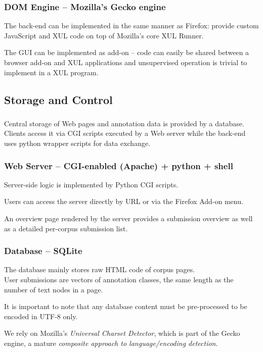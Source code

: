 \documentclass{beamer}
\begin{document}
        \begin{frame}
            \frametitle{DOM Engine -- Mozilla's Gecko engine}
            \begin{block}{}
                The back-end can be implemented in the same manner as Firefox: provide custom JavaScript and XUL code on top of Mozilla's core XUL Runner. 

                \medskip
                The GUI can be implemented as add-on -- code can easily be shared between a browser add-on and XUL applications and unsupervised operation is trivial to implement in a XUL program.
            \end{block}
        \end{frame}
        
    \subsection{Storage and Control}

        \begin{frame}
            \frametitle{}
            \begin{block}{}
                Central storage of Web pages and annotation data is provided by a database. \\
                Clients access it via CGI scripts executed by a Web server while the back-end uses python wrapper scripts for data exchange.
            \end{block}
        \end{frame}
    

        \begin{frame}
            \frametitle{Web Server -- CGI-enabled (Apache) + python + shell}
            \begin{block}{}
                Server-side logic is implemented by Python CGI scripts.

                Users can access the server directly by URL or via the Firefox Add-on menu.

                An overview page rendered by the server provides a submission overview as well as a detailed per-corpus submission list.
            \end{block}
        \end{frame}
        
        \begin{frame}
            \frametitle{Database -- SQLite}
            \begin{block}{}
                The database mainly stores raw HTML code of corpus pages. \\
                User submissions are vectors of annotation classes, the same length as the number of text nodes in a page.

\pause
                \medskip
                It is important to note that any database content must be pre-processed to be encoded in UTF-8 only.

                We rely on Mozilla's \emph{Universal Charset Detector},
                which is part of the Gecko engine, a mature \emph{composite approach to language/encoding detection}.
            \end{block}
        \end{frame}
        
\end{document}
